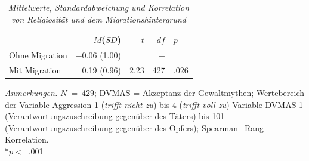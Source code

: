 \begin{table}[htb]
    \caption[Mittelwerte, Standardabweichung und Korrelation von Religiosität und dem Migrationshintergrund]{\textit {Mittelwerte, Standardabweichung und Korrelation von Religiosität und dem Migrationshintergrund}} 
    \label{Explo_Migration}
    \centering
    \begin{adjustbox}{width=5.5cm} %
    \small
    \begin{tabular}{lrrr}
      \hline
                   & $M$($SD$) & $t$ & $df$ & $p$ & \\
      \hline
    Ohne Migration & $-$0.06 (1.00) &   & $-$      \\
    Mit Migration  & 0.19 (0.96)    & 2.23  & 427 & .026      \\
       \hline
    \end{tabular}
    \end{adjustbox}
    
    \begin{tablenotes}
        \item \textit{Anmerkungen.} \(N\)~=~429; DVMAS = Akzeptanz der Gewaltmythen; Wertebereich der Variable Aggression 1 (\textit{trifft nicht zu}) bis 4 (\textit{trifft voll zu}) Variable DVMAS 1 (Verantwortungszuschreibung gegenüber des Täters) bis 101 (Verantwortungszuschreibung gegenüber des Opfers); Spearman$-$Rang$-$Korrelation. \\ *$p<$~.001
      \end{tablenotes}
    \end{table}

